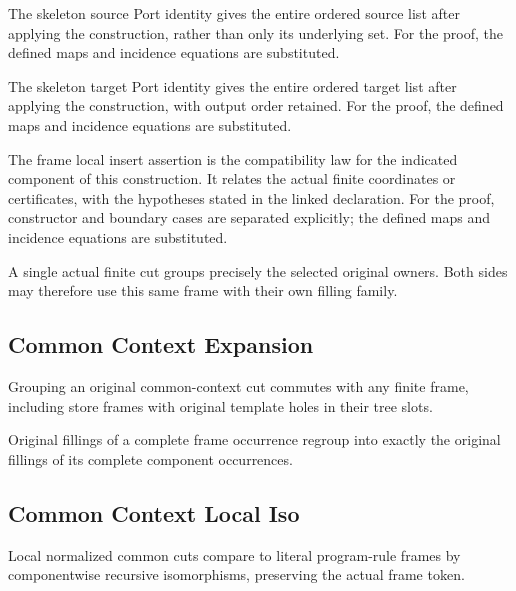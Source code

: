 The skeleton source Port identity gives the entire ordered source list after applying the construction, rather than only its underlying set.
For the proof, the defined maps and incidence equations are substituted.
\par{}

The skeleton target Port identity gives the entire ordered target list after applying the construction, with output order retained.
For the proof, the defined maps and incidence equations are substituted.
\par{}

The frame local insert assertion is the compatibility law for the indicated component of this construction. It relates the actual finite coordinates or certificates, with the hypotheses stated in the linked declaration.
For the proof, constructor and boundary cases are separated explicitly; the defined maps and incidence equations are substituted.
\par{}

A single actual finite cut groups precisely the selected original owners. Both sides may therefore use this same frame with their own filling family.
\par{}

\subsection{Common Context Expansion}
Grouping an original common-context cut commutes with any finite frame, including store frames with original template holes in their tree slots.

Original fillings of a complete frame occurrence regroup into exactly the original fillings of its complete component occurrences.
\par{}

\subsection{Common Context Local Iso}
Local normalized common cuts compare to literal program-rule frames by componentwise recursive isomorphisms, preserving the actual frame token.

